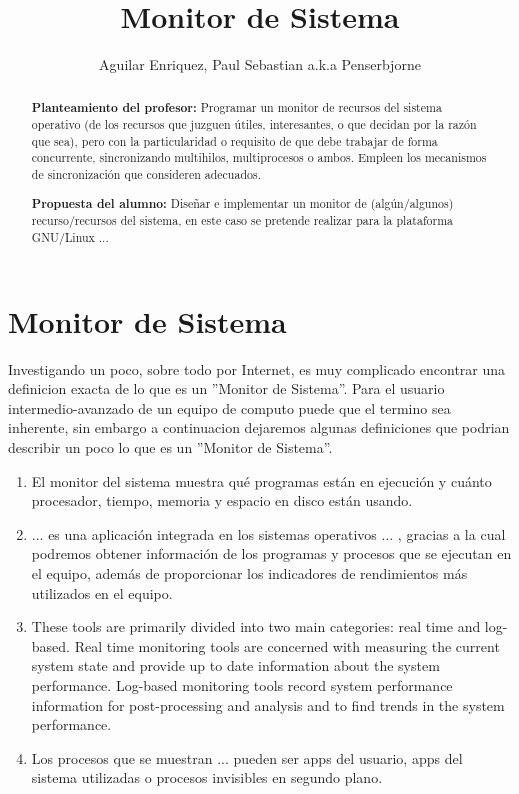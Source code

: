 \documentclass[a4paper,11pt]{article}
\title{Monitor de Sistema}
\author{Aguilar Enriquez, Paul Sebastian a.k.a Penserbjorne}
\begin{document}
\maketitle
\tableofcontents

\begin{abstract}
\textbf{Planteamiento del profesor:} Programar un monitor de recursos del sistema operativo (de los recursos que juzguen útiles, interesantes, o que decidan por la razón que sea), pero con la particularidad o requisito de que
debe trabajar de forma concurrente, sincronizando multihilos, multiprocesos o ambos. Empleen los mecanismos de sincronización que consideren adecuados.

\textbf{Propuesta del alumno:} Diseñar e implementar un monitor de (algún/algunos) recurso/recursos del sistema, en este caso se pretende realizar para la plataforma GNU/Linux ...
\end{abstract}

\section{Monitor de Sistema}

Investigando un poco, sobre todo por Internet, es muy complicado encontrar una definicion exacta de lo que es un ''Monitor de Sistema''. Para el usuario intermedio-avanzado de un equipo de computo puede que el termino sea inherente, sin embargo a continuacion dejaremos algunas definiciones que podrian describir un poco lo que es un ''Monitor de Sistema''.

\begin{enumerate}
  \item El monitor del sistema muestra qué programas están en ejecución y cuánto procesador, tiempo, memoria y espacio en disco están usando.\cite{ref:web1}
  
  \item ... es una aplicación integrada en los sistemas operativos ... , gracias a la cual podremos obtener información de los programas y procesos que se ejecutan en el equipo, además de proporcionar los indicadores de rendimientos más utilizados en el equipo.\cite{ref:web2}
  
  \item These tools are primarily divided into two main categories: real time and log-based. Real time monitoring tools are concerned with measuring the current system state and provide up to date information about the system performance. Log-based monitoring tools record system performance information for post-processing and analysis and to find trends in the system performance.\cite{ref:web3}
  
  \item Los procesos que se muestran ... pueden ser apps del usuario, apps del sistema utilizadas o procesos invisibles en segundo plano.\cite{ref:web4}

\end{enumerate}
\end{document}
